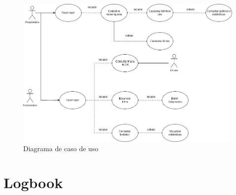 \documentclass[
  a4paper,%
  12pt,%
  english,%
  brazilian,%
]{article}
\begin{document}
            \begin{figure}[h]
\centering
\caption{Diagrama de caso de uso}%
\label{fig:caso-uso}
\includegraphics[width=1.1\textwidth]{Logos/CasoUso.jpeg}
\end{figure}

\section*{Logbook}
\end{document}
